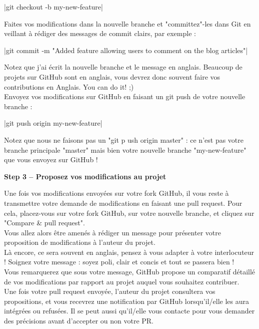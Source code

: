 |git checkout -b my-new-feature|

 Faites vos modifications dans la nouvelle branche et "committez"-les dans Git en veillant à rédiger des messages de commit clairs, par exemple : 

|git commit -m "Added feature allowing users to comment on the blog articles"|

Notez que j'ai écrit la nouvelle branche et le message en anglais. Beaucoup de projets sur GitHub sont en anglais, vous devrez donc souvent faire vos contributions en Anglais. You can do it! ;)\\ 

Envoyez vos modifications sur GitHub en faisant un git push de votre nouvelle branche : 

|git push origin my-new-feature|

Notez que nous ne faisons pas un "git p
ush origin master" : ce n'est pas votre branche principale "master" mais bien votre nouvelle branche "my-new-feature" que vous envoyez sur GitHub ! 

\textbf{Step 3 – Proposez vos modifications au projet}\

Une fois vos modifications envoyées sur votre fork GitHub, il vous reste à transmettre votre demande de modifications en faisant une pull request. Pour cela, placez-vous sur votre fork GitHub, sur votre nouvelle branche, et cliquez sur "Compare \& pull request".\\

 Vous allez alors être amenés à rédiger un message pour présenter votre proposition de modifications à l'auteur du projet.\\

Là encore, ce sera souvent en anglais, pensez à vous adapter à votre interlocuteur ! Soignez votre message : soyez poli, clair et concis et tout se passera bien ! \\

Vous remarquerez que sous votre message, GitHub propose un comparatif détaillé de vos modifications par rapport au projet auquel vous souhaitez contribuer. \\

Une fois votre pull request envoyée, l'auteur du projet consultera vos propositions, et vous recevrez une notification par GitHub lorsqu'il/elle les aura intégrées ou refusées. Il se peut aussi qu'il/elle vous contacte pour vous demander des précisions avant d'accepter ou non votre PR. \\